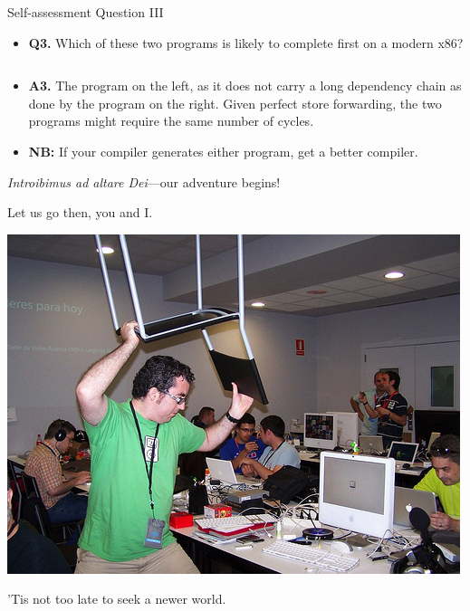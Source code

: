 \documentclass{beamer}
\newcommand{\code}[2]{
  \tiny{{}}
}
\begin{document}
\begin{frame}{Self-assessment Question III}
\begin{itemize}
\item \textbf{Q3.} Which of these two programs is likely to complete first
	on a modern x86?\\
\begin{columns}
\begin{column}{.5\textwidth}
\code{A}{code/introq3a.S}
\end{column}
\begin{column}{.5\textwidth}
\code{B}{code/introq3b.S}
\end{column}
\end{columns}
\item \textbf{A3.} The program on the left, as it does not carry a long
	dependency chain as done by the program on the right. Given perfect
	store forwarding, the two programs might require the same number of
	cycles.
\item \textbf{NB:} If your compiler generates either program, get a better compiler.
\end{itemize}
\end{frame}

\begin{frame}{\textit{Introibimus ad altare Dei}---our adventure begins!}
\begin{center}
Let us go then, you and I.

\vspace{.25in}
\includegraphics[scale=0.33]{images/angry.jpg}
\vspace{.25in}

'Tis not too late to seek a newer world.
\end{center}
\end{frame}
\end{document}
